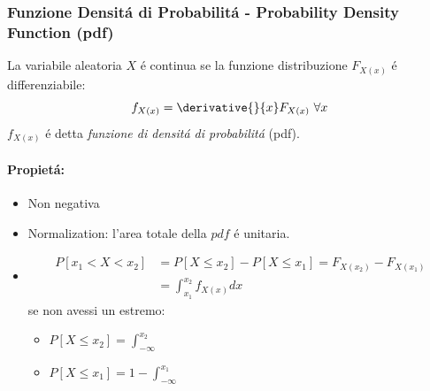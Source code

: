         \subsubsection{Funzione Densitá di Probabilitá - Probability Density Function (pdf)}
            La variabile aleatoria $X$ é continua se la funzione distribuzione $F_{X(x)}$ é differenziabile:
            \[
                f_{X(x)} = \derivative{}{x}F_{X(x)}\ \forall x    
            \]
            $f_{X(x)}$ é detta \emph{funzione di densitá di probabilitá} (pdf).
            \paragraph{Propietá:}
                \begin{itemize}
                    \item {Non negativa}
                    \item {Normalization: l'area totale della $pdf$ é unitaria.}
                    \item {
                        \begin{align}
                            P[x_1<X<x_2] &= P[X\leq x_2]  - P[X\leq x_1] = F_{X(x_2)} - F_{X(x_1)}  \nonumber \\
                                         &= \int_{x_1}^{x_2} f_{X(x)} dx\nonumber
                        \end{align}
                        se non avessi un estremo:
                        \begin{itemize}
                            \item {$ P[X\leq x_2] = \int_{-\infty}^{x_2}$}
                            \item {$ P[X\leq x_1] = 1-\int_{-\infty}^{x_1}$}
                        \end{itemize}
                    }
                \end{itemize}
